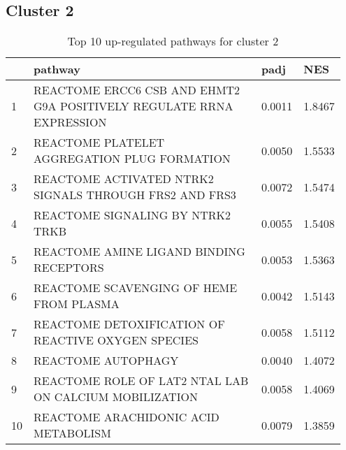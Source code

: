 \documentclass{article}
\begin{document}
\subsection{Cluster 2 }
\begin{table}[H]
\centering
\begin{tabular}{p{0.05\linewidth}p{0.7\linewidth}p{0.1\linewidth}p{0.1\linewidth}}
  \hline
 & pathway & padj & NES \\ 
  \hline
1 & REACTOME ERCC6 CSB AND EHMT2 G9A POSITIVELY REGULATE RRNA EXPRESSION & 0.0011 & 1.8467 \\ 
  2 & REACTOME PLATELET AGGREGATION PLUG FORMATION & 0.0050 & 1.5533 \\ 
  3 & REACTOME ACTIVATED NTRK2 SIGNALS THROUGH FRS2 AND FRS3 & 0.0072 & 1.5474 \\ 
  4 & REACTOME SIGNALING BY NTRK2 TRKB & 0.0055 & 1.5408 \\ 
  5 & REACTOME AMINE LIGAND BINDING RECEPTORS & 0.0053 & 1.5363 \\ 
  6 & REACTOME SCAVENGING OF HEME FROM PLASMA & 0.0042 & 1.5143 \\ 
  7 & REACTOME DETOXIFICATION OF REACTIVE OXYGEN SPECIES & 0.0058 & 1.5112 \\ 
  8 & REACTOME AUTOPHAGY & 0.0040 & 1.4072 \\ 
  9 & REACTOME ROLE OF LAT2 NTAL LAB ON CALCIUM MOBILIZATION & 0.0058 & 1.4069 \\ 
  10 & REACTOME ARACHIDONIC ACID METABOLISM & 0.0079 & 1.3859 \\ 
   \hline
\end{tabular}
\caption{Top 10 up-regulated pathways for cluster 2} 
\label{tab:q3_2_2}
\end{table}
\end{document}
